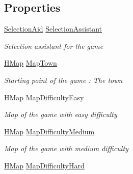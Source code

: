 \subsection*{Properties}
\begin{DoxyCompactItemize}
\item 
\hyperlink{class_hel_project_1_1_u_i_1_1_selection_aid}{Selection\+Aid} \hyperlink{class_hel_project_1_1_u_i_1_1_play_screen_a06addd08f18e59b70cded27e325a6ed1}{Selection\+Assistant}
\begin{DoxyCompactList}\small\item\em Selection assistant for the game \end{DoxyCompactList}\item 
\hyperlink{class_hel_project_1_1_game_world_1_1_map_1_1_h_map}{H\+Map} \hyperlink{class_hel_project_1_1_u_i_1_1_play_screen_a8f6f7d590c13e9f21db49c181daabc32}{Map\+Town}
\begin{DoxyCompactList}\small\item\em Starting point of the game \+: The town \end{DoxyCompactList}\item 
\hyperlink{class_hel_project_1_1_game_world_1_1_map_1_1_h_map}{H\+Map} \hyperlink{class_hel_project_1_1_u_i_1_1_play_screen_a6fa66d24cfdc2801ecfd0e72f1c1669b}{Map\+Difficulty\+Easy}
\begin{DoxyCompactList}\small\item\em Map of the game with easy difficulty \end{DoxyCompactList}\item 
\hyperlink{class_hel_project_1_1_game_world_1_1_map_1_1_h_map}{H\+Map} \hyperlink{class_hel_project_1_1_u_i_1_1_play_screen_a4dc67a0bb9e4dfc7fabcb35e45529771}{Map\+Difficulty\+Medium}
\begin{DoxyCompactList}\small\item\em Map of the game with medium difficulty \end{DoxyCompactList}\item 
\hyperlink{class_hel_project_1_1_game_world_1_1_map_1_1_h_map}{H\+Map} \hyperlink{class_hel_project_1_1_u_i_1_1_play_screen_a8dd43c45856c0c6ed338e214e4009d2d}{Map\+Difficulty\+Hard}

\end{DoxyCompactItemize}

